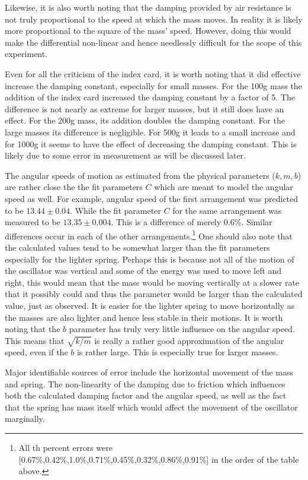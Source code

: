 \documentclass[11pt]{article}
\begin{document}
Likewise, it is also worth noting that the damping provided by air resistance is not truly proportional to the speed at which the mass moves. In reality it is likely more proportional to the square of the mass' speed. However, doing this would make the differential non-linear and hence needlessly difficult for the scope of this experiment.

Even for all the criticism of the index card, it is worth noting that it did effective increase the damping constant, especially for small masses. For the 100g mass the addition of the index card increased the damping constant by a factor of 5. The difference is not nearly as extreme for larger masses, but it still does have an effect. For the 200g mass, its addition doubles the damping constant. For the large masses its difference is negligible. For 500g it leads to a small increase and for 1000g it seems to have the effect of decreasing the damping constant. This is likely due to some error in measurement as will be discussed later.

The angular speeds of motion as estimated from the physical parameters (\(k,m,b\)) are rather close the the fit parameters \(C\) which are meant to model the angular speed as well. For example, angular speed of the first arrangement was predicted to be \(13.44 \pm 0.04 \). While the fit parameter \(C\) for the same arrangement was measured to be \(13.35 \pm 0.004 \). This is a difference of merely 0.6\%. Similar differences occur in each of the other arrangements.\footnote{All th percent errors were [0.67\%,0.42\%,1.0\%,0.71\%,0.45\%,0.32\%,0.86\%,0.91\%] in the order of the table above.} One should also note that the calculated values tend to be somewhat larger than the fit parameters especially for the lighter spring. Perhaps this is because not all of the motion of the oscillator was vertical and some of the energy was used to move left and right, this would mean that the mass would be moving vertically at a slower rate that it possibly could and thus the parameter would be larger than the calculated value, just as observed. It is easier for the lighter spring to move horizontally as the masses are also lighter and hence less stable in their motions. It is worth noting that the \(b\) parameter has truly very little influence on the angular speed. This means that \(\sqrt{k/m}\) is really a rather good approximation of the angular speed, even if the \(b\) is rather large. This is especially true for larger masses.

Major identifiable sources of error include the horizontal movement of the mass and spring. The non-linearity of the damping due to friction which influences both the calculated damping factor and the angular speed, as well as the fact that the spring has mass itself which would affect the movement of the oscillator marginally.
\end{document}
